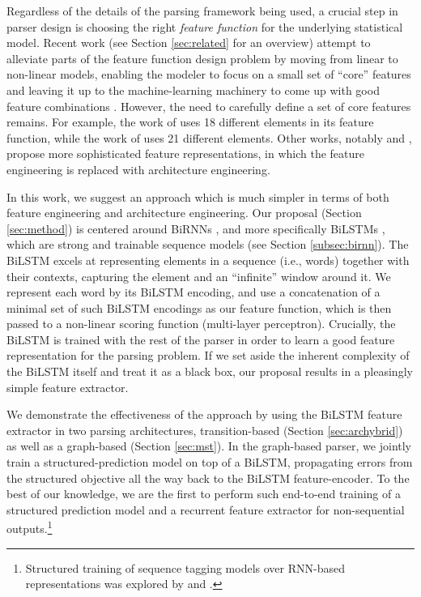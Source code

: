 \documentclass[11pt]{article}
\begin{document}
Regardless of the details of the parsing framework being used, a crucial step in
parser design is choosing the right \emph{feature function} for the underlying
statistical model.
Recent work (see Section \ref{sec:related} for an overview)
attempt to alleviate parts of the feature function design problem by moving from linear
to non-linear models, enabling the modeler to focus on a small set of ``core''
features and leaving it up to the machine-learning machinery to come up with good feature
combinations
\cite{chen2014fast,pei2015effective,lei-EtAl:2014:P14-1,taubtabib2015template}.
However, the need to carefully define a set of core features remains. For
example, the work of  uses 18 different elements in its
feature function, while the work of  uses 21 different
elements. Other works, notably  and , propose more
sophisticated feature representations, in which the feature engineering is
replaced with architecture engineering.

In this work, we suggest an approach which is much simpler in terms of both
feature engineering and architecture engineering.
Our proposal (Section \ref{sec:method}) is centered around BiRNNs
\cite{irsoy2014opinion,schuster1997bidirectional}, and more specifically BiLSTMs
\cite{graves2008supervised},
which are strong and trainable sequence models (see Section \ref{subsec:birnn}).
The BiLSTM excels at representing elements in a sequence (i.e., words) together with
their contexts, capturing the element and an ``infinite'' window around
it.  We represent each word by its \mbox{BiLSTM} encoding, and use a concatenation of
a minimal set of such BiLSTM encodings as our feature function, which is then passed to a
non-linear scoring function (multi-layer perceptron). Crucially, the BiLSTM is
trained with the rest of the parser in order to learn a good feature
representation for the parsing problem.
If we set aside the inherent complexity of the \mbox{BiLSTM} itself and treat it as a
black box, our proposal results in a pleasingly simple feature extractor.

We demonstrate the effectiveness of the approach by using the BiLSTM feature
extractor in two parsing architectures, transition-based (Section \ref{sec:archybrid}) as well as a
graph-based (Section \ref{sec:mst}).
In the graph-based parser, we jointly train a structured-prediction model on top of a
BiLSTM, propagating errors from the structured objective all the way back to
the \mbox{BiLSTM} feature-encoder.  To the best of our knowledge, we are the first to
perform such end-to-end training of a structured prediction model and a
recurrent feature extractor for non-sequential outputs.\footnote{Structured
training of sequence tagging models over RNN-based representations was explored by
 and .}
\end{document}

